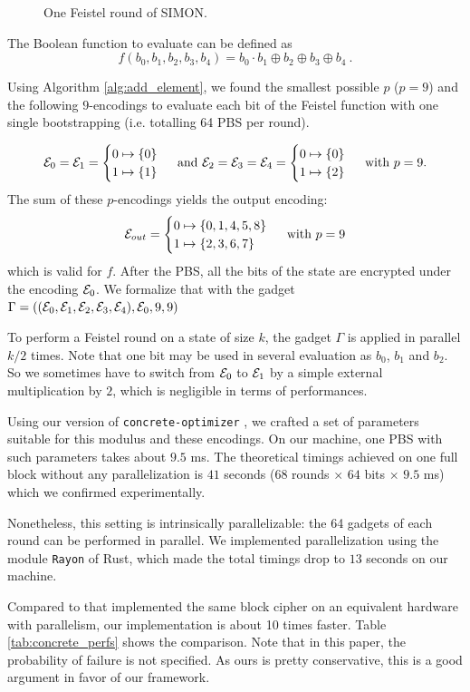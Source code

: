 \begin{figure}
    \centering
    
    \caption{One Feistel round of SIMON. }     
    \label{fig:simon_cipher}
\end{figure}


The Boolean function to evaluate can be defined as $$f(b_0, b_1, b_2, b_3, b_4) = b_0 \cdot b_1 \oplus b_2 \oplus b_3 \oplus b_4~.$$


Using Algorithm \ref{alg:add_element}, we found the smallest possible $p$ ($p = 9$) and the following $9$-encodings to evaluate each bit of the Feistel function with one single bootstrapping (i.e. totalling 64 PBS per round). 


\[\mathcal{E}_0 = \mathcal{E}_1 = \begin{cases} 0 \mapsto \{0\} \\ 1 \mapsto \{1\} \end{cases} \text{ and } \mathcal{E}_2 = \mathcal{E}_3 = \mathcal{E}_4 = \begin{cases} 0 \mapsto \{0\} \\ 1 \mapsto \{2\} \end{cases} \text{ with } p = 9.\] The sum of these $p$-encodings yields the output encoding: \[\mathcal{E}_{out} = \begin{cases} 0 \mapsto \{0, 1, 4, 5, 8\} \\ 1 \mapsto \{2, 3, 6, 7\} \end{cases} \text{ with } p=9\] which is valid for $f$. After the PBS, all the bits of the state are encrypted under the encoding $\mathcal{E}_0$. We formalize that with the gadget $\Gamma = \left ((\mathcal{E}_0, \mathcal{E}_1, \mathcal{E}_2, \mathcal{E}_3, \mathcal{E}_4), \mathcal{E}_0, 9, 9\right )$


To perform a Feistel round on a state of size $k$, the gadget $\Gamma$ is applied in parallel $k / 2$ times. Note that one bit may be used in several evaluation as $b_0$, $b_1$ and $b_2$. So we sometimes have to switch from $\mathcal{E}_0$ to $\mathcal{E}_1$ by a simple external multiplication by $2$, which is negligible in terms of performances.


Using our version of \texttt{concrete-optimizer} \cite{concrete-optimizer}, we crafted a set of parameters suitable for this modulus and these encodings. 
On our machine, one PBS with such parameters takes about $9.5$ ms. The theoretical timings achieved on one full block without any parallelization is $41$ seconds ($68$ rounds $\times$ $64$ bits $\times$ $9.5$ ms)  which we confirmed experimentally.


Nonetheless, this setting is intrinsically parallelizable: the 64 gadgets of each round can be performed in parallel. We implemented parallelization using the module \texttt{Rayon} of Rust, which made the total timings drop to $13$ seconds on our machine. 

Compared to \cite{DBLP:conf/fps/BendoukhaSSQS22} that implemented the same block cipher on an equivalent hardware with parallelism, our implementation is about 10 times faster. Table \ref{tab:concrete_perfs} shows the comparison. Note that in this paper, the probability of failure is not specified. As ours is pretty conservative, this is a good argument in favor of our framework.


